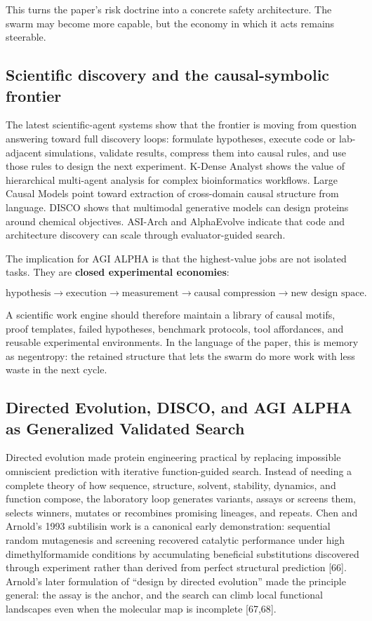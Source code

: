 \documentclass[
  11pt,
]{article}
\begin{document}
This turns the paper's risk doctrine into a concrete safety
architecture. The swarm may become more capable, but the economy in
which it acts remains steerable.

\subsection{Scientific discovery and the causal-symbolic
frontier}\label{scientific-discovery-and-the-causal-symbolic-frontier}

The latest scientific-agent systems show that the frontier is moving
from question answering toward full discovery loops: formulate
hypotheses, execute code or lab-adjacent simulations, validate results,
compress them into causal rules, and use those rules to design the next
experiment. K-Dense Analyst shows the value of hierarchical multi-agent
analysis for complex bioinformatics workflows. Large Causal Models point
toward extraction of cross-domain causal structure from language. DISCO
shows that multimodal generative models can design proteins around
chemical objectives. ASI-Arch and AlphaEvolve indicate that code and
architecture discovery can scale through evaluator-guided search.

The implication for AGI ALPHA is that the highest-value jobs are not
isolated tasks. They are \textbf{closed experimental economies}:

\[
\text{hypothesis}
\rightarrow
\text{execution}
\rightarrow
\text{measurement}
\rightarrow
\text{causal compression}
\rightarrow
\text{new design space}.
\]

A scientific work engine should therefore maintain a library of causal
motifs, proof templates, failed hypotheses, benchmark protocols, tool
affordances, and reusable experimental environments. In the language of
the paper, this is memory as negentropy: the retained structure that
lets the swarm do more work with less waste in the next cycle.

\subsection{Directed Evolution, DISCO, and AGI ALPHA as Generalized
Validated
Search}\label{directed-evolution-disco-and-agi-alpha-as-generalized-validated-search}

Directed evolution made protein engineering practical by replacing
impossible omniscient prediction with iterative function-guided search.
Instead of needing a complete theory of how sequence, structure,
solvent, stability, dynamics, and function compose, the laboratory loop
generates variants, assays or screens them, selects winners, mutates or
recombines promising lineages, and repeats. Chen and Arnold's 1993
subtilisin work is a canonical early demonstration: sequential random
mutagenesis and screening recovered catalytic performance under high
dimethylformamide conditions by accumulating beneficial substitutions
discovered through experiment rather than derived from perfect
structural prediction {[}66{]}. Arnold's later formulation of ``design
by directed evolution'' made the principle general: the assay is the
anchor, and the search can climb local functional landscapes even when
the molecular map is incomplete {[}67,68{]}.
\end{document}
